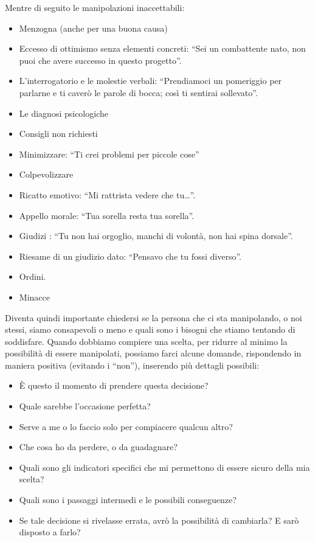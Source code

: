 \documentclass[12pt]{book} %
\begin{document}
Mentre di seguito le manipolazioni inaccettabili:

\begin{itemize}
\item Menzogna (anche per una buona causa) 
\item Eccesso di ottimismo senza elementi concreti: “Sei un combattente nato, non puoi che avere successo in questo progetto”. 
\item L'interrogatorio e le molestie verbali: “Prendiamoci un pomeriggio per parlarne e ti caverò le parole di bocca; così ti sentirai sollevato”. 
\item Le diagnosi psicologiche
\item Consigli non richiesti
\item Minimizzare: “Ti crei problemi per piccole cose”
\item Colpevolizzare
\item Ricatto emotivo: “Mi rattrista vedere che tu…”. 
\item Appello morale: “Tua sorella resta tua sorella”. 
\item Giudizi : “Tu non hai orgoglio, manchi di volontà, non hai spina dorsale”. 
\item Riesame di un giudizio dato: “Pensavo che tu fossi diverso”. 
\item Ordini. 
\item Minacce
\end{itemize}

Diventa quindi importante chiedersi se la persona che ci sta manipolando, o noi stessi, siamo consapevoli o meno e quali
sono i bisogni che stiamo tentando di soddisfare.
Quando dobbiamo compiere una scelta, per ridurre al minimo la possibilità di essere manipolati, possiamo farci
alcune domande, rispondendo in maniera positiva (evitando i “non”), inserendo più dettagli possibili:

\begin{itemize}
\item È questo il momento di prendere questa decisione? 
\item Quale sarebbe l'occasione perfetta?
\item Serve a me o lo faccio solo per compiacere qualcun altro? 
\item Che cosa ho da perdere, o da guadagnare? 
\item Quali sono gli indicatori specifici che mi permettono di essere sicuro della mia scelta? 
\item Quali sono i passaggi intermedi e le possibili conseguenze? 
\item Se tale decisione si rivelasse errata, avrò la possibilità di cambiarla? E sarò disposto a farlo?
\end{itemize}
\end{document}
